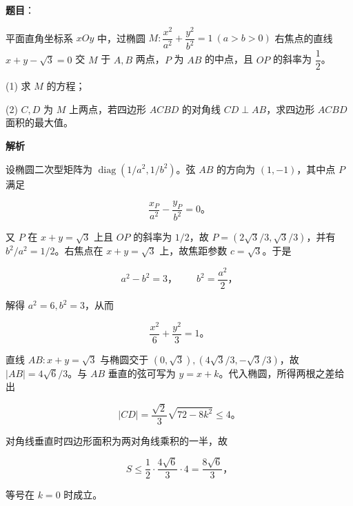 \begin{answer}



\end{answer}
\begin{answer}

\textbf{题目}：

平面直角坐标系 $xOy$ 中，过椭圆 $M:\dfrac{x^2}{a^2}+\dfrac{y^2}{b^2}=1\ (a>b>0)$ 右焦点的直线 $x+y-\sqrt3=0$ 交 $M$ 于 $A,B$ 两点，$P$ 为 $AB$ 的中点，且 $OP$ 的斜率为 $\dfrac12$。

(1) 求 $M$ 的方程；

(2) $C,D$ 为 $M$ 上两点，若四边形 $ACBD$ 的对角线 $CD\perp AB$，求四边形 $ACBD$ 面积的最大值。

\textbf{解析}


设椭圆二次型矩阵为 $\operatorname{diag}(1/a^2,1/b^2)$。弦 $AB$ 的方向为 $(1,-1)$，其中点 $P$ 满足

\nopagebreak[4]
\[\frac{x_P}{a^2}-\frac{y_P}{b^2}=0\text{。}\]

又 $P$ 在 $x+y=\sqrt3$ 上且 $OP$ 的斜率为 $1/2$，故 $P=(2\sqrt3/3,\sqrt3/3)$，并有 $b^2/a^2=1/2$。右焦点在 $x+y=\sqrt3$ 上，故焦距参数 $c=\sqrt3$。于是

\nopagebreak[4]
\[a^2-b^2=3\text{，}\qquad b^2=\frac{a^2}{2}\text{，}\]

解得 $a^2=6,b^2=3$，从而

\nopagebreak[4]
\[\frac{x^2}{6}+\frac{y^2}{3}=1\text{。}\]


直线 $AB:x+y=\sqrt3$ 与椭圆交于 $(0,\sqrt3),(4\sqrt3/3,-\sqrt3/3)$，故 $|AB|=4\sqrt6/3$。与 $AB$ 垂直的弦可写为 $y=x+k$。代入椭圆，所得两根之差给出

\nopagebreak[4]
\[|CD|=\frac{\sqrt2}{3}\sqrt{72-8k^2}\leqslant4\text{。}\]

对角线垂直时四边形面积为两对角线乘积的一半，故

\nopagebreak[4]
\[S\leqslant\frac12\cdot\frac{4\sqrt6}{3}\cdot4=\frac{8\sqrt6}{3}\text{，}\]

等号在 $k=0$ 时成立。



\end{answer}
